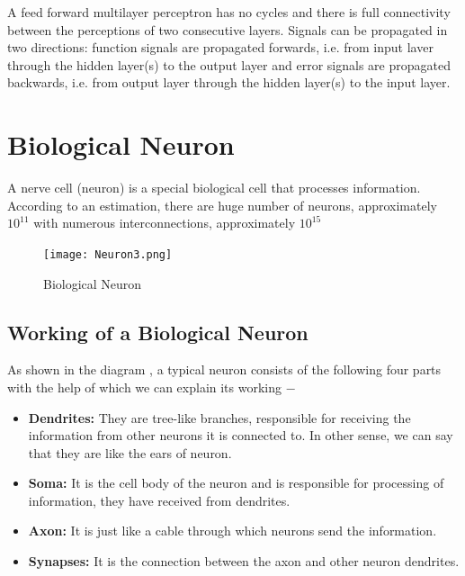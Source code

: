 \documentclass{report}
\begin{document}
A feed forward multilayer perceptron has no cycles and there is full connectivity between the perceptions of two consecutive layers. Signals can be propagated in two directions: function signals are propagated forwards, i.e. from input laver through the hidden layer(s) to the output layer and error signals are propagated backwards, i.e. from output layer through the hidden layer(s) to the input layer.

\section{Biological Neuron}
A nerve cell (neuron) is a special biological cell that processes information. According to an estimation, there are huge number of neurons, approximately $10^{11}$ with numerous interconnections, approximately $10^{15}$

\begin{figure}[htp]
\centering
\texttt{[image: Neuron3.png]}
\caption{Biological Neuron}
\label{fig5}
\end{figure}

\subsection{Working of a Biological Neuron}

As shown in the diagram \cite{BNN_figure}, a typical neuron consists of the following four parts with the help of which we can explain its working −

\begin{itemize}
\item \textbf{Dendrites: } They are tree-like branches, responsible for receiving the information from other neurons it is connected to. In other sense, we can say that they are like the ears of neuron.

\item \textbf{Soma: } It is the cell body of the neuron and is responsible for processing of information, they have received from dendrites.

\item \textbf{Axon: } It is just like a cable through which neurons send the information.

\item \textbf{Synapses: } It is the connection between the axon and other neuron dendrites.

\end{itemize}
\end{document}
